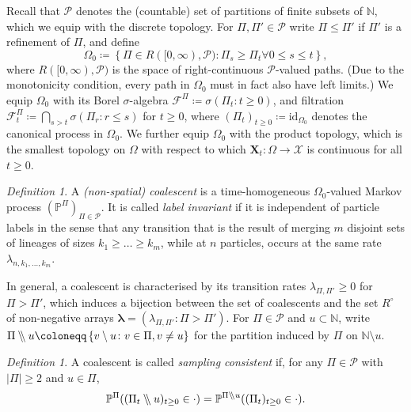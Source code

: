 \documentclass[reqno,draft]{amsart}
\numberwithin{equation}{section}
\theoremstyle{plain}
\theoremstyle{remark}
\newtheorem{definition}[theorem]{Definition}
\newcommand{\N}{\mathbb{N}} %
\renewcommand{\P}{\mathbb{P}} %
\newcommand{\id}{\mathrm{id}}
\newcommand{\fpart}{\Pi} %
\newcommand{\rates}{R^\circ} %
\newcommand{\wo}{\mathbin{{\setminus}\mspace{-5mu}{\setminus}}}
\begin{document}
Recall that $\mathcal{P}$ denotes the (countable) set of partitions of finite subsets of $\N$, which we equip with the discrete topology. For $\fpart, \fpart' \in \mathcal{P}$ write $\fpart \le \fpart'$ if $\fpart'$ is a refinement of $\fpart$, and define \[
    \Omega_0 \coloneqq \left\{ \fpart \in R([0,\infty),\mathcal{P})\colon \fpart_s \ge \fpart_t \forall 0 \le s \le t \right\},
\] where $R([0,\infty),\mathcal{P})$ is the space of right-continuous $\mathcal{P}$-valued paths. (Due to the monotonicity condition, every path in $\Omega_0$ must in fact also have left limits.)
We equip $\Omega_0$ with its Borel $\sigma$-algebra $\mathcal{F}^\fpart \coloneqq \sigma(\fpart_t\colon t\ge 0)$, and filtration $\mathcal{F}^\fpart_t \coloneqq \bigcap_{s > t} \sigma(\fpart_r\colon r \le s)$ for $t \ge 0$, where $(\fpart_{t})_{t\ge 0} \coloneqq \id_{\Omega_0}$ denotes the canonical process in $\Omega_0$.
We further equip $\Omega_0$ with the product topology, which is the smallest topology on $\Omega$ with respect to which $\boldsymbol X_t \colon \Omega \to \mathcal{X}$ is continuous for all $t \ge 0$.

\begin{definition}\label{def:NSCP}
    A \emph{(non-spatial) coalescent} is a time-homogeneous $\Omega_0$-valued Markov process $(\P^{\fpart})_{\fpart\in \mathcal{P}}$. It is called \emph{label invariant} if it is independent of particle labels in the sense that any transition that is the result of merging $m$ disjoint sets of lineages of sizes $k_1\ge \ldots \ge k_m$, while at $n$ particles, occurs at the same rate $\lambda_{n,k_1, \ldots ,k_m}$.
\end{definition}

In general, a coalescent is characterised by its transition rates $\lambda_{\fpart,\fpart'} \ge 0$ for $\fpart > \fpart'$, which induces a bijection between the set of coalescents and the set $\rates$ of non-negative arrays $\boldsymbol \lambda = (\lambda_{\fpart,\fpart'}\colon \fpart > \fpart')$.
For $\fpart \in \mathcal{P}$ and $u\subset \N$, write $\fpart \wo u \coloneqq \left\{ v \setminus u\colon v \in \fpart, v \neq u \right\}$ for the partition induced by $\fpart$ on $\N\setminus u$. %
\begin{definition}\label{def:NSCP2}
    A coalescent is called \emph{sampling consistent} if, for any $\fpart \in \mathcal{P}$ with $|\fpart| \ge 2$ and $u\in \fpart$, \[
        \P^{\fpart}((\fpart_t\wo u)_{t\ge 0}\in \cdot ) = \P^{\fpart \wo u}((\fpart_t)_{t\ge 0}\in \cdot ).
    \]
\end{definition}
\end{document}
